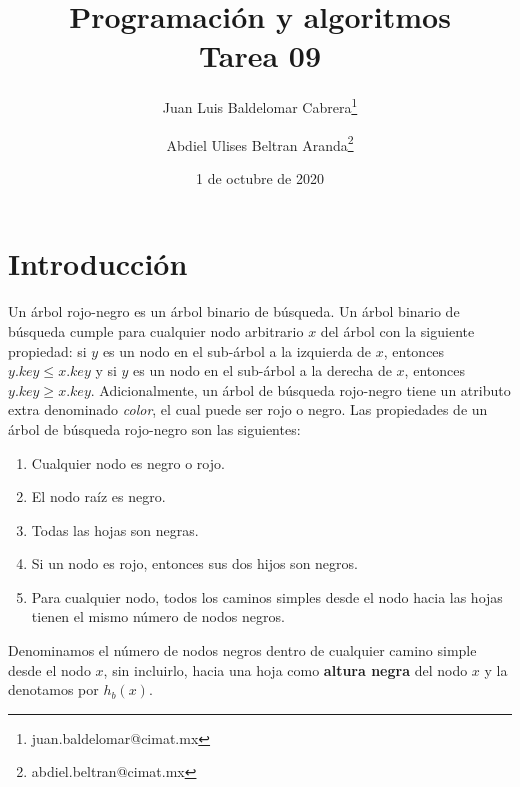 \documentclass[10pt,a4paper]{article}
\title{Programaci\'on y algoritmos\\ Tarea 09}
\author[1]{Juan Luis Baldelomar Cabrera\thanks{juan.baldelomar@cimat.mx}}
\author[1]{Abdiel Ulises Beltran Aranda\thanks{abdiel.beltran@cimat.mx}}
\affil[1]{Centro de Investigaci\'on en Matem\'aticas}
\date{1 de octubre de 2020}
\begin{document}
\maketitle
\thispagestyle{fancy}


\section*{Introducci\'on}
Un \'arbol rojo-negro es un \'arbol binario de b\'usqueda. Un \'arbol binario de b\'usqueda cumple para cualquier nodo arbitrario $x$ del \'arbol con la siguiente propiedad: si $y$ es un nodo en el sub-\'arbol a la izquierda de $x$, entonces $y.key\leq x.key$ y si $y$ es un nodo en el sub-\'arbol a la derecha de $x$, entonces $y.key\geq x.key$. Adicionalmente, un \'arbol de b\'usqueda rojo-negro tiene un atributo extra denominado \textit{color}, el cual puede ser rojo o negro. Las propiedades de un \'arbol de b\'usqueda rojo-negro son las siguientes:
\begin{enumerate}
    \item Cualquier nodo es negro o rojo.
    \item El nodo ra\'iz es negro.
    \item Todas las hojas son negras.
    \item Si un nodo es rojo, entonces sus dos hijos son negros.
    \item Para cualquier nodo, todos los caminos simples desde el nodo hacia las hojas tienen el mismo n\'umero de nodos negros.
\end{enumerate}

Denominamos el n\'umero de nodos negros dentro de cualquier camino simple desde el nodo $x$, sin incluirlo, hacia una hoja como \textbf{altura negra} del nodo $x$ y la denotamos por $h_b(x)$.
\end{document}
